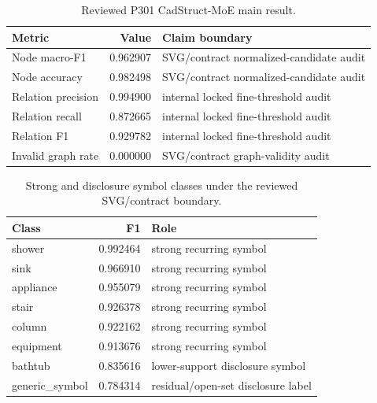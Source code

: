 
\begin{table}[t]
\centering
\small
\caption{Reviewed P301 CadStruct-MoE main result.}
\label{tab:p301_main_result}
\begin{tabular}{lrl}
\toprule
Metric & Value & Claim boundary \\
\midrule
Node macro-F1 & 0.962907 & SVG/contract normalized-candidate audit \\
Node accuracy & 0.982498 & SVG/contract normalized-candidate audit \\
Relation precision & 0.994900 & internal locked fine-threshold audit \\
Relation recall & 0.872665 & internal locked fine-threshold audit \\
Relation F1 & 0.929782 & internal locked fine-threshold audit \\
Invalid graph rate & 0.000000 & SVG/contract graph-validity audit \\
\bottomrule
\end{tabular}
\end{table}

\begin{table}[t]
\centering
\small
\caption{Strong and disclosure symbol classes under the reviewed SVG/contract boundary.}
\label{tab:p301_symbol_classes}
\begin{tabular}{lrl}
\toprule
Class & F1 & Role \\
\midrule
shower & 0.992464 & strong recurring symbol \\
sink & 0.966910 & strong recurring symbol \\
appliance & 0.955079 & strong recurring symbol \\
stair & 0.926378 & strong recurring symbol \\
column & 0.922162 & strong recurring symbol \\
equipment & 0.913676 & strong recurring symbol \\
bathtub & 0.835616 & lower-support disclosure symbol \\
generic\_symbol & 0.784314 & residual/open-set disclosure label \\
\bottomrule
\end{tabular}
\end{table}

